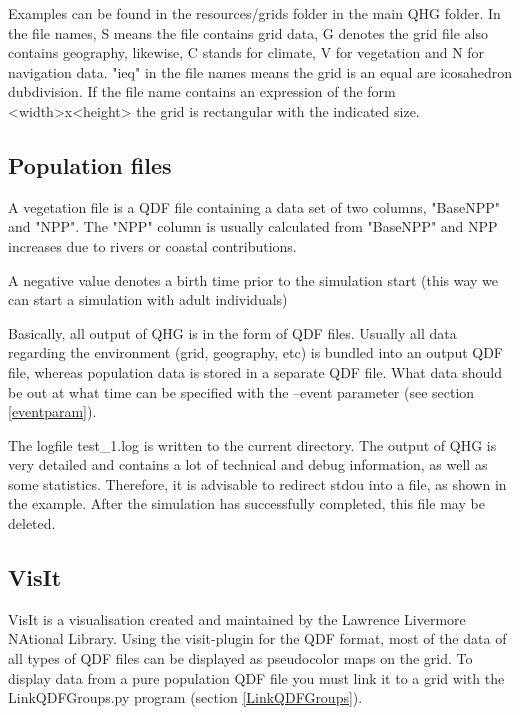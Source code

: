 Examples can be found in the resources/grids folder in the main QHG folder. In the file names, S means the file contains grid data, G denotes the grid file also contains geography, likewise, C stands for climate, V for vegetation and N for navigation data. "ieq" in the file names means the grid is an equal are icosahedron dubdivision. If the file name contains an expression of the form <width>x<height> the grid is rectangular with the indicated size.


\subsection{Population files} \label{vegfile}
  A vegetation file is a QDF file containing a data set of two columns, "BaseNPP" and "NPP". The "NPP" column is usually calculated from "BaseNPP" and NPP increases  due to rivers or coastal contributions.

A negative value denotes a birth time prior to the simulation start (this way we can start a simulation with adult individuals)



Basically, all output of QHG is in the form of QDF files. Usually all data regarding the environment (grid, geography, etc) is bundled into an output QDF file, whereas population data is stored in a separate QDF file.
What data should be out at what time can be specified with the  {\selectfont --event parameter} (see section \ref{eventparam}).


The logfile test_1.log is written to the current directory. The output of QHG is very detailed and contains a lot of technical and debug information, as well as some statistics. Therefore, it is advisable to redirect stdou into a file, as shown in the example. After the simulation has successfully completed, this file may be deleted.


\subsection{VisIt} \label{VisIt}
  VisIt is a visualisation created and maintained by the Lawrence Livermore NAtional Library.
  Using the visit-plugin for the QDF format, most of the data of all types of QDF files can be displayed as pseudocolor maps on the grid. To display data from a pure population QDF file you must link it to a grid with the  {\selectfont LinkQDFGroups.py} program (section \ref{LinkQDFGroups}).

